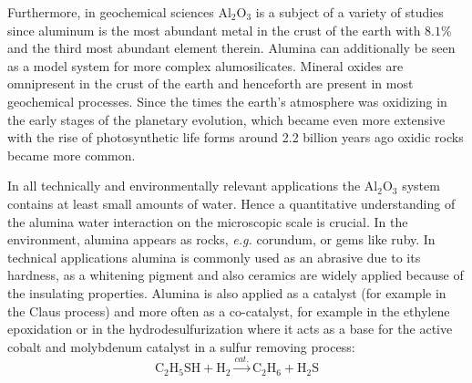 \documentclass[11pt,DIV=13,BCOR=5mm,a4paper,headinclude]{scrbook}
\begin{document}
Furthermore, in geochemical sciences Al$_2$O$_3$ is a subject of a variety of studies since aluminum is the most abundant metal in the crust of the earth with  $8.1\%$ %
and the third most abundant element therein\cite{dtv-Atlas,Riedel}.
Alumina can additionally be seen as a model system for more complex alumosilicates.
Mineral oxides are omnipresent in the crust of the earth and henceforth are present in most geochemical processes.
Since the times the earth's atmosphere was oxidizing in the early stages of the planetary evolution\cite{Trail2011}, which became even more extensive with the rise of photosynthetic life forms\cite{Frei2009,Buick2008,Olson2006} around 2.2 billion years ago\cite{Kirschvink2008} oxidic rocks became more common.


In all technically and environmentally relevant applications the Al$_2$O$_3$ system contains at least small amounts of water.
Hence a quantitative understanding of the alumina water interaction on the microscopic scale is crucial.
In the environment, alumina appears as rocks, \textit{e.g.} corundum, or gems like ruby.
In technical applications alumina is commonly used as an abrasive due to its hardness, as a whitening pigment and also ceramics are widely applied because of the insulating properties.
Alumina is also applied as a catalyst (for example in the Claus process) and more often as a co-catalyst, for example in the ethylene epoxidation\cite{Oezbek2013} or in the hydrodesulfurization where it acts as a base for the active cobalt and molybdenum catalyst in a sulfur removing process:
\begin{equation*}
 \textrm{C}_2\textrm{H}_5\textrm{SH} + \textrm{H}_2  \xrightarrow{cat.} \textrm{C}_2\textrm{H}_6 + \textrm{H}_2\textrm{S}
\end{equation*}
\end{document}
